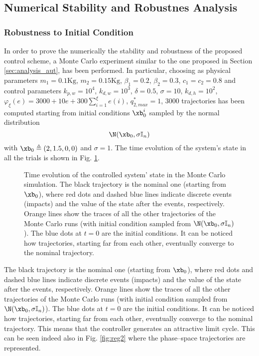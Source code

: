 \subsection{Numerical Stability and Robustnes Analysis}
%
\subsubsection{Robustness to Initial Condition}
In order to prove the numerically the stability and robustness of the proposed control scheme, a Monte Carlo experiment similar to the one proposed in Section \ref{sec:analysis_aut}, has been performed. In particular, choosing as physical parameters $m_1=0.1\text{Kg}$, $m_2=0.15\text{Kg}$, $\beta_1=0.2$, $\beta_2=0.3$, $c_1=c_2=0.8$ and control parameters $k_{p,w} = 10^4$, $k_{d,w} = 10^3$, $\delta = 0.5$, $\sigma = 10$, $k_{d,h} = 10^2$, $\varphi_\xi(e) = 3000 + 10e + 300\sum_{i = 1}^{\xi}e(i)$, $q_{2,max}^* = 1$, 3000 trajectories has been computed starting from initial conditions $\xb_0^i$ sampled by the normal distribution
%
\begin{equation}
    \N(\xb_0,\sigma\mathbb{I}_n)
\end{equation}
%
with $\xb_0\triangleq(2,1.5,0,0)$ and $\sigma=1$. The time evolution of the system's state in all the trials is shown in Fig. \ref{fig:reg1}.
%
\begin{figure}[!ht]
    \centering
    \caption[Time evolution of the controlled system' state in the Monte Carlo simulation]{Time evolution of the controlled system' state in the Monte Carlo simulation. The black trajectory is the nominal one (starting from $\xb_0$), where red dots and dashed blue lines indicate discrete events (impacts) and the value of the state after the events, respectively. Orange lines show the traces of all the other trajectories of the Monte Carlo runs (with initial condition sampled from $\N(\xb_0,\sigma\mathbb{I}_n)$). The blue dots at $t=0$ are the initial conditions. It can be noticed how trajectories, starting far from each other, eventually converge to the nominal trajectory.}
    \label{fig:reg1}
\end{figure}
%
The black trajectory is the nominal one (starting from $\xb_0$), where red dots and dashed blue lines indicate discrete events (impacts) and the value of the state after the events, respectively. Orange lines show the traces of all the other trajectories of the Monte Carlo runs (with initial condition sampled from $\N(\xb_0,\sigma\mathbb{I}_n)$). The blue dots at $t=0$ are the initial conditions. It can be noticed how trajectories, starting far from each other, eventually converge to the nominal trajectory. This means that the controller generates an attractive limit cycle. This can be seen indeed also in Fig. \ref{fig:reg2} where the phase--space trajectories are represented.
